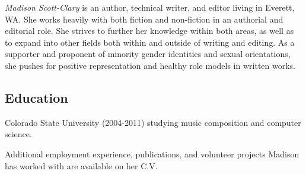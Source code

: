 \documentclass[letterpaper]{memoir}
\begin{document}


\textit{\large Madison Scott-Clary} is an author, technical writer, and editor living in Everett, WA. She works heavily with both fiction and non-fiction in an authorial and editorial role. She strives to further her knowledge within both areas, as well as to expand into other fields both within and outside of writing and editing. As a supporter and proponent of minority gender identities and sexual orientations, she pushes for positive representation and healthy role models in written works.



\subsection{Education}\label{education}

\begin{description}
\tightlist
\item[University] \hfill
Colorado State University (2004-2011) studying music composition and
computer science.
\end{description}

Additional employment experience, publications, and volunteer projects
Madison has worked with are available on her C.V.
\end{document}
